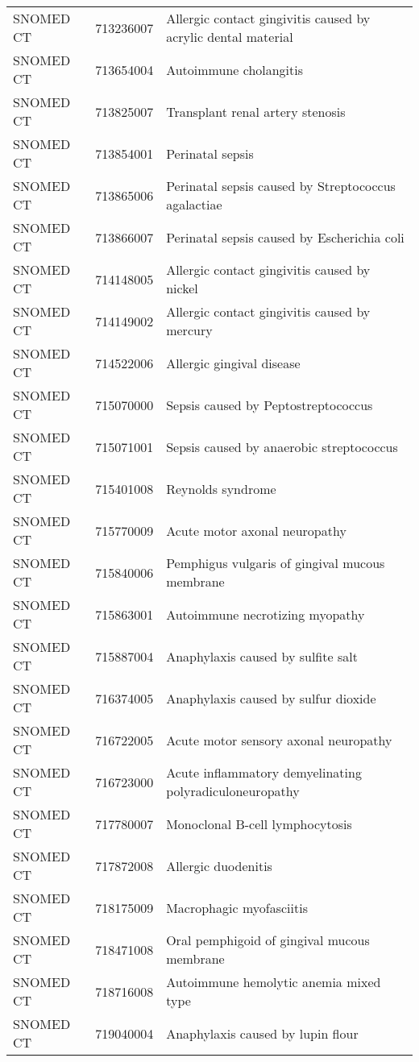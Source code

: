 \begin{longtable}{p{}p{}p{}}
  SNOMED CT & 713236007 & Allergic contact gingivitis caused by acrylic dental material \\ 
  SNOMED CT & 713654004 & Autoimmune cholangitis \\ 
  SNOMED CT & 713825007 & Transplant renal artery stenosis \\ 
  SNOMED CT & 713854001 & Perinatal sepsis \\ 
  SNOMED CT & 713865006 & Perinatal sepsis caused by Streptococcus agalactiae \\ 
  SNOMED CT & 713866007 & Perinatal sepsis caused by Escherichia coli \\ 
  SNOMED CT & 714148005 & Allergic contact gingivitis caused by nickel \\ 
  SNOMED CT & 714149002 & Allergic contact gingivitis caused by mercury \\ 
  SNOMED CT & 714522006 & Allergic gingival disease \\ 
  SNOMED CT & 715070000 & Sepsis caused by Peptostreptococcus \\ 
  SNOMED CT & 715071001 & Sepsis caused by anaerobic streptococcus \\ 
  SNOMED CT & 715401008 & Reynolds syndrome \\ 
  SNOMED CT & 715770009 & Acute motor axonal neuropathy \\ 
  SNOMED CT & 715840006 & Pemphigus vulgaris of gingival mucous membrane \\ 
  SNOMED CT & 715863001 & Autoimmune necrotizing myopathy \\ 
  SNOMED CT & 715887004 & Anaphylaxis caused by sulfite salt \\ 
  SNOMED CT & 716374005 & Anaphylaxis caused by sulfur dioxide \\ 
  SNOMED CT & 716722005 & Acute motor sensory axonal neuropathy \\ 
  SNOMED CT & 716723000 & Acute inflammatory demyelinating polyradiculoneuropathy \\ 
  SNOMED CT & 717780007 & Monoclonal B-cell lymphocytosis \\ 
  SNOMED CT & 717872008 & Allergic duodenitis \\ 
  SNOMED CT & 718175009 & Macrophagic myofasciitis \\ 
  SNOMED CT & 718471008 & Oral pemphigoid of gingival mucous membrane \\ 
  SNOMED CT & 718716008 & Autoimmune hemolytic anemia mixed type \\ 
  SNOMED CT & 719040004 & Anaphylaxis caused by lupin flour \\ 

\end{longtable}
